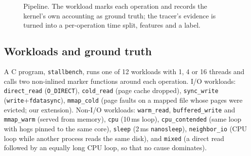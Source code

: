 \documentclass[conference]{IEEEtran}
\begin{document}
\begin{figure}[t]
\centering
{}
\caption{Pipeline. The workload marks each operation and records the kernel's own accounting as ground truth; the tracer's evidence is turned into a per-operation time split, features and a label.}
\label{fig:arch}
\end{figure}

\subsection{Workloads and ground truth}
A C program, \texttt{stallbench}, runs one of 12 workloads with 1, 4 or 16 threads and calls two non-inlined marker functions around each operation. I/O workloads: \texttt{direct\_read} (\texttt{O\_DIRECT}), \texttt{cold\_read} (page cache dropped), \texttt{sync\_write} (\texttt{write}+\texttt{fdatasync}), \texttt{mmap\_cold} (page faults on a mapped file whose pages were evicted; our extension). Non-I/O workloads: \texttt{warm\_read}, \texttt{buffered\_write} and \texttt{mmap\_warm} (served from memory), \texttt{cpu} (10\,ms loop), \texttt{cpu\_contended} (same loop with hogs pinned to the same core), \texttt{sleep} (2\,ms \texttt{nanosleep}), \texttt{neighbor\_io} (CPU loop while another process reads the same disk), and \texttt{mixed} (a direct read followed by an equally long CPU loop, so that no cause dominates).
\end{document}
